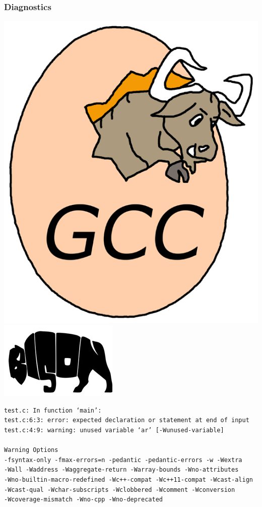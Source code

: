 \documentclass{beamer}
\begin{document}
\begin{frame}[fragile,shrink=25]
  \frametitle{Diagnostics}
  \begin{center}
    \includegraphics[scale=0.1]{gcc}
    \hfill
    \includegraphics[scale=0.5]{bison}
    \begin{verbatim}
test.c: In function ‘main’:
test.c:6:3: error: expected declaration or statement at end of input
test.c:4:9: warning: unused variable ‘ar’ [-Wunused-variable]

Warning Options
-fsyntax-only -fmax-errors=n -pedantic -pedantic-errors -w -Wextra
-Wall -Waddress -Waggregate-return -Warray-bounds -Wno-attributes
-Wno-builtin-macro-redefined -Wc++-compat -Wc++11-compat -Wcast-align
-Wcast-qual -Wchar-subscripts -Wclobbered -Wcomment -Wconversion
-Wcoverage-mismatch -Wno-cpp -Wno-deprecated
    \end{verbatim}
  \end{center}
\end{frame}
\end{document}
